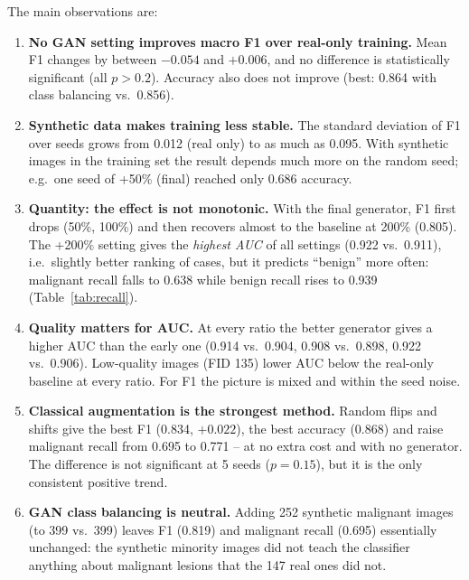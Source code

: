 \noindent The main observations are:
\begin{enumerate}
  \item \textbf{No GAN setting improves macro F1 over real-only training.} Mean F1 changes by between $-0.054$ and
        $+0.006$, and no difference is statistically significant (all $p>0.2$). Accuracy also does not improve
        (best: 0.864 with class balancing vs.\ 0.856).
  \item \textbf{Synthetic data makes training less stable.} The standard deviation of F1 over seeds grows from 0.012
        (real only) to as much as 0.095. With synthetic images in the training set the result depends much more on the
        random seed; e.g.\ one seed of +50\% (final) reached only 0.686 accuracy.
  \item \textbf{Quantity: the effect is not monotonic.} With the final generator, F1 first drops (50\%, 100\%) and then
        recovers almost to the baseline at 200\% (0.805). The +200\% setting gives the \emph{highest AUC} of all
        settings (0.922 vs.\ 0.911), i.e.\ slightly better ranking of cases, but it predicts ``benign'' more often:
        malignant recall falls to 0.638 while benign recall rises to 0.939 (Table~\ref{tab:recall}).
  \item \textbf{Quality matters for AUC.} At every ratio the better generator gives a higher AUC than the early one
        (0.914 vs.\ 0.904, 0.908 vs.\ 0.898, 0.922 vs.\ 0.906). Low-quality images (FID 135) lower AUC below the real-only
        baseline at every ratio. For F1 the picture is mixed and within the seed noise.
  \item \textbf{Classical augmentation is the strongest method.} Random flips and shifts give the best F1 (0.834,
        $+0.022$), the best accuracy (0.868) and raise malignant recall from 0.695 to 0.771 -- at no extra cost and with
        no generator. The difference is not significant at 5 seeds ($p=0.15$), but it is the only consistent positive trend.
  \item \textbf{GAN class balancing is neutral.} Adding 252 synthetic malignant images (to 399 vs.\ 399) leaves F1
        (0.819) and malignant recall (0.695) essentially unchanged: the synthetic minority images did not teach the
        classifier anything about malignant lesions that the 147 real ones did not.
\end{enumerate}

\FloatBarrier
